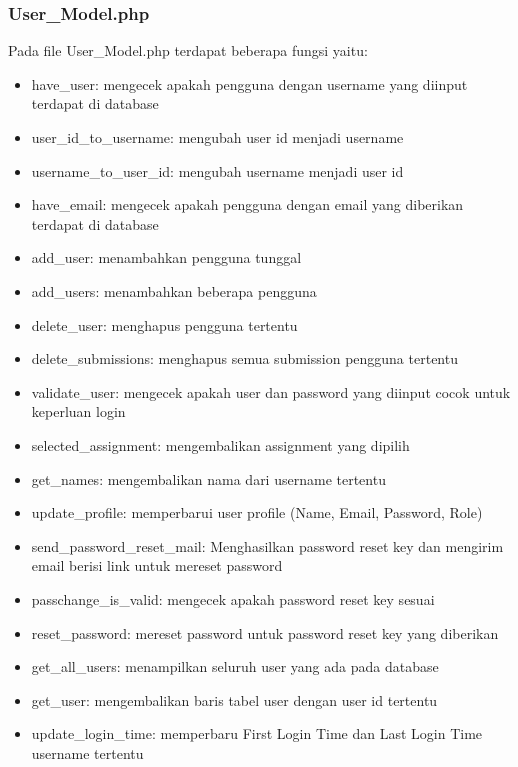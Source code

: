 \subsubsection{User\_Model.php}
Pada file User\_Model.php terdapat beberapa fungsi yaitu:
\begin{itemize}
	\item have\_user: mengecek apakah pengguna dengan username yang diinput terdapat di database
	\item user\_id\_to\_username: mengubah user id menjadi username
	\item username\_to\_user\_id: mengubah username menjadi user id
	\item have\_email: mengecek apakah pengguna dengan email yang diberikan terdapat di database
	\item add\_user: menambahkan pengguna tunggal
	\item add\_users: menambahkan beberapa pengguna
	\item delete\_user: menghapus pengguna tertentu
	\item delete\_submissions: menghapus semua submission pengguna tertentu
	\item validate\_user: mengecek apakah user dan password yang diinput cocok untuk keperluan login
	\item selected\_assignment: mengembalikan assignment yang dipilih
	\item get\_names: mengembalikan nama dari username tertentu
	\item update\_profile: memperbarui user profile (Name, Email, Password, Role)
	\item send\_password\_reset\_mail: Menghasilkan password reset key dan mengirim email berisi link untuk mereset password
	\item passchange\_is\_valid: mengecek apakah password reset key sesuai
	\item reset\_password: mereset password untuk password reset key yang diberikan
	\item get\_all\_users: menampilkan seluruh user yang ada pada database
	\item get\_user: mengembalikan baris tabel user dengan user id tertentu
	\item update\_login\_time: memperbaru First Login Time dan Last Login Time username tertentu	
\end{itemize}